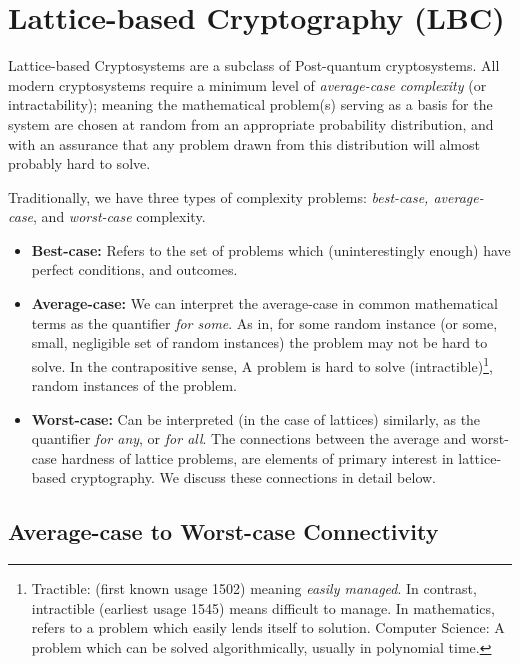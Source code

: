 \section{Lattice-based Cryptography (LBC)} 

Lattice-based Cryptosystems are a subclass of Post-quantum cryptosystems. All modern cryptosystems require a minimum level of \emph{average-case complexity} (or intractability); meaning the mathematical problem(s) serving as a basis for the system are chosen at random from an appropriate probability distribution, and with an assurance that any problem drawn from this distribution will almost probably  hard to solve. 

Traditionally, we have three types of complexity problems: \textit{best-case, average-case}, and \textit{worst-case} complexity. 

\begin{itemize}
    \item \textbf{Best-case:} Refers to the set of problems which (uninterestingly enough) have perfect conditions, and outcomes.
    \item \textbf{Average-case:} We can interpret the average-case in common mathematical terms as the quantifier \emph{for some}. As in, for some random instance (or some, small, negligible set of random instances) the problem may not be hard to solve. In the contrapositive sense, A problem is hard to solve (intractible)\footnote{Tractible: (first known usage 1502) meaning \textit{easily managed}. In contrast, intractible (earliest usage 1545) means difficult to manage. In mathematics, refers to a problem which easily lends itself to solution. Computer Science: A problem which can be solved algorithmically, usually in polynomial time. },  random instances of the problem.
    \item \textbf{Worst-case:} Can be interpreted (in the case of lattices) similarly, as the quantifier \emph{for any}, or \emph{for all}. The connections between the average and worst-case hardness of lattice problems, are elements of primary interest in lattice-based cryptography. We discuss these connections in detail below.
\end{itemize}

\subsection{Average-case to Worst-case Connectivity}


